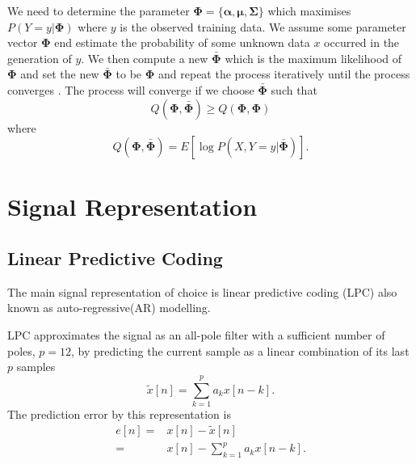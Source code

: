 We need to determine the parameter $\mathbf{\Phi} = \{\boldsymbol{\alpha}, \boldsymbol{\mu}, \mathbf{\Sigma}\}$ which maximises $P(Y=y\vert \mathbf{\Phi})$ where $y$ is the observed training data. We assume some parameter vector $\mathbf{\Phi}$ end estimate the probability of some unknown data $x$ occurred in the generation of $y$. We then compute a new $\bar{\mathbf{\Phi}}$ which is the maximum likelihood of $\mathbf{\Phi}$ and set the new $\bar{\mathbf{\Phi}}$ to be $\mathbf{\Phi}$ and repeat the process iteratively until the process converges \cite{taletek}. The process will converge if we choose $\bar{\mathbf{\Phi}}$ such that 
\begin{equation}
	\label{eq:q_criteria}
	Q(\mathbf{\Phi},\bar{\mathbf{\Phi}})\geq Q(\mathbf{\Phi},\mathbf{\Phi})
\end{equation}
where 
\begin{equation}
	\label{eq:q_function}
	Q(\mathbf{\Phi},\bar{\mathbf{\Phi}}) = E[\log P(X,Y=y\vert \bar{\mathbf{\Phi}})].
\end{equation}

\section{Signal Representation} %
\label{sec:signal_representation}
\subsection{Linear Predictive Coding} %
\label{sub:lpc}
The main signal representation of choice is linear predictive coding (LPC) also known as auto-regressive(AR) modelling. 

LPC approximates the signal as an all-pole filter with a sufficient number of poles, \eg $p=12$, by predicting the current sample as a linear combination of its last $p$ samples \cite{digsig}
\begin{equation}
	\tilde{x}[n] = \sum_{k=1}^{p}a_k x[n-k].
\end{equation}
The prediction error by this representation is 
\begin{equation}
	\begin{split}
		e[n]= & x[n]-\tilde{x}[n]\\
		= & x[n]-\sum_{k=1}^{p}a_k x[n-k].
	\end{split}
\end{equation}

